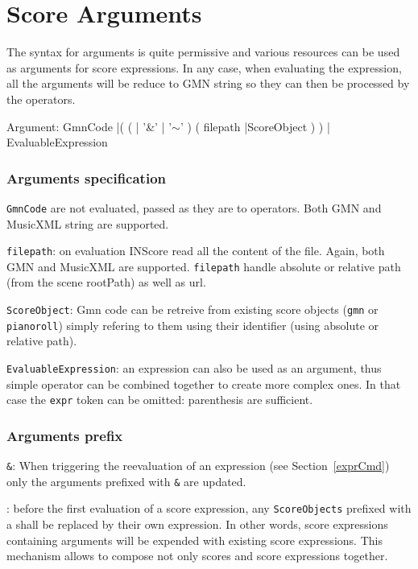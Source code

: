 \documentclass[a4paper,twoside]{report}
\newcommand{\sublevel}[1]	{\section{#1}}
\newcommand{\OSC}[1]		{\texttt{#1}}
\newcommand{\lowTilde} 		{\texttildelow}
\let\olditemize\itemize
\let\oldenditemize\enditemize
\renewenvironment{itemize} 	{\olditemize \setlength{\itemsep}{1mm}}{\oldenditemize}
\begin{document}
\sublevel{Score Arguments}
\label{arguments}
The syntax for arguments is quite permissive and various resources can be used as arguments for score expressions. In any case, when evaluating the expression, all the arguments will be reduce to GMN string so they can then be processed by the operators.
\begin{rail}
Argument: 	 GmnCode
			|(	
				( | '\&' | '$\sim$' )
				(		
					 filepath
					|ScoreObject
				)
			 )
			| 	EvaluableExpression
\end{rail}

\subsubsection{Arguments specification}

\begin{itemize}
\item \OSC{GmnCode} are not evaluated, passed as they are to operators. Both GMN and MusicXML string are supported.
\item \OSC{filepath}: on evaluation INScore read all the content of the file. Again, both GMN and MusicXML are supported. \OSC{filepath} handle absolute or relative path (from the scene rootPath) as well as url.
\item \OSC{ScoreObject}: Gmn code can be retreive from existing score objects (\OSC{gmn} or \OSC{pianoroll}) simply refering to them using their identifier (using absolute or relative path).
\item \OSC{EvaluableExpression}: an expression can also be used as an argument, thus simple operator can be combined together to create more complex ones. In that case the \OSC{expr} token can be omitted: parenthesis are sufficient.
\end{itemize}

\subsubsection{Arguments prefix}

\begin{itemize}
\item \OSC{\&}: When triggering the reevaluation of an expression (see Section~\ref{exprCmd}) only the arguments prefixed with \OSC{\&} are updated.


\item \OSC{\lowTilde}: before the first evaluation of a score expression, any \OSC{ScoreObjects} prefixed with a \OSC{\lowTilde} shall be replaced by their own expression. In other words, score expressions containing \OSC{\lowTilde} arguments will be expended with existing score expressions. This mechanism allows to compose not only scores and score expressions together.

\end{itemize}
\end{document}
